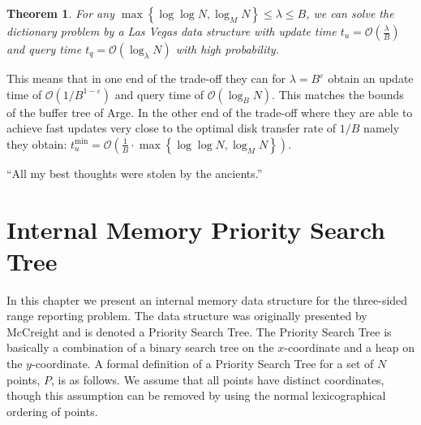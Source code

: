 \documentclass[twoside,11pt,openright]{report}
\def \epsilon {\varepsilon}
\newtheorem{theorem}{Theorem}
\begin{document}
\begin{theorem}
For any $\max\left\lbrace \log\log N, \log_M N \right\rbrace \leq \lambda \leq B$, we can solve the dictionary problem by a Las Vegas data structure with update time $t_u = \mathcal{O}(\frac{\lambda}{B})$ and query time $t_q = \mathcal{O}(\log_\lambda N)$ with high probability.
\end{theorem}

This means that in one end of the trade-off they can for $\lambda = B^\epsilon$ obtain an update time of $\mathcal{O}(1/B^{1-\epsilon})$ and query time of $\mathcal{O}(\log_B N)$. This matches the bounds of the buffer tree of Arge. In the other end of the trade-off where they are able to achieve fast updates very close to the optimal disk transfer rate of $1/B$ namely they obtain: $t_u^{\min} = \mathcal{O}(\frac{1}{B} \cdot \max\left\lbrace \log\log N, \log_M N \right\rbrace)$.

\begin{savequote}[0.5\textwidth]
``All my best thoughts were stolen by the ancients.''
\end{savequote}
\chapter{Internal Memory Priority Search Tree}
\label{chp:internal_pst}
In this chapter we present an internal memory data structure for the three-sided range reporting problem. The data structure was originally presented by McCreight \cite{DBLP:journals/siamcomp/McCreight85} and is denoted a Priority Search Tree. The Priority Search Tree is basically a combination of a binary search tree on the $x$-coordinate and a heap on the $y$-coordinate. A formal definition of a Priority Search Tree for a set of $N$ points, $P$, is as follows. We assume that all points have distinct coordinates, though this assumption can be removed by using the normal lexicographical ordering of points.
\end{document}
